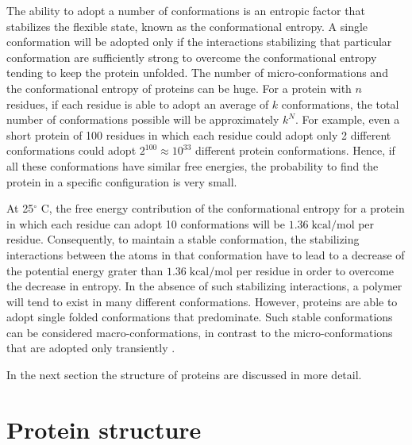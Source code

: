 
The ability to adopt a number of conformations is an entropic factor that stabilizes the flexible state, known as the conformational entropy.
A single conformation will be adopted only if the interactions stabilizing that particular conformation are sufficiently strong to overcome the conformational entropy tending to keep the protein unfolded. The number of micro-conformations and the conformational entropy of proteins can be huge. For a protein with $n$ residues, if each residue is able to adopt an average of $k$ conformations, the total number of conformations possible will be approximately $k^N$. For example, even a short protein of 100 residues in which each residue could adopt only 2 different conformations could adopt $2^{100} \approx 10^{33}$ different protein conformations. Hence, if all these conformations have similar free energies, the probability to find the protein in a specific configuration is very small. 

At 25$^\circ$ C, the free energy contribution of the conformational entropy for a protein in which each residue can adopt 10 conformations will be $1.36 \;\text{kcal}/\text{mol}$ per residue. Consequently, to maintain a stable conformation, the stabilizing interactions between the atoms in that conformation have to lead to a decrease of the potential energy grater than $1.36 \;\text{kcal}/\text{mol}$ per residue in order to overcome the decrease in entropy. In the absence of such stabilizing interactions, a polymer will tend to exist in many different conformations. However, proteins are able to adopt single folded conformations that predominate. Such stable conformations can be considered macro-conformations, in contrast to the micro-conformations that are adopted only transiently
 \cite{creighton2010biophysical}.

In the next section the structure of proteins are discussed in more detail.

\section{Protein structure}\label{sec:prot-structure}

